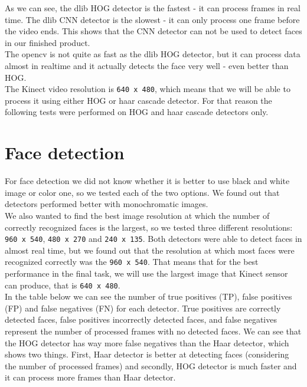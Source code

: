\documentclass[12pt,a4paper]{article}
\begin{document}
	As we can see, the dlib HOG detector is the fastest - it can process frames in real time. The dlib CNN detector is the slowest - it can only process one frame before the video ends. This shows that the CNN detector can not be used to detect faces in our finished product. \\
	
	The opencv is not quite as fast as the dlib HOG detector, but it can process data almost in realtime and it actually detects the face very well - even better than HOG. \\
	
	The Kinect video resolution is \texttt{640 x 480}, which means that we will be able to process it using either HOG or haar cascade detector. For that reason the following tests were performed on HOG and haar cascade detectors only. \\
	
	\section{Face detection}
	
	For face detection we did not know whether it is better to use black and white image or color one, so we tested each of the two options. We found out that detectors performed better with monochromatic images. \\
	
	We also wanted to find the best image resolution at which the number of correctly recognized faces is the largest, so we tested three different resolutions: \texttt{960 x 540}, \texttt{480 x 270} and \texttt{240 x 135}. Both detectors were able to detect faces in almost real time, but we found out that the resolution at which most faces were recognized correctly was the \texttt{960 x 540}. That means that for the best performance in the final task, we will use the largest image that Kinect sensor can produce, that is \texttt{640 x 480}. \\
	
	In the table below we can see the number of true positives (TP), false positives (FP) and false negatives (FN) for each detector. 
	True positives are correctly detected faces, false positives incorrectly detected faces, and false negatives represent the number of processed frames with no detected faces.
	We can see that the HOG detector has way more false negatives than the Haar detector, which shows two things. First, Haar detector is better at detecting faces (considering the number of processed frames) and secondly, HOG detector is much faster and it can process more frames than Haar detector.
	
\end{document}
